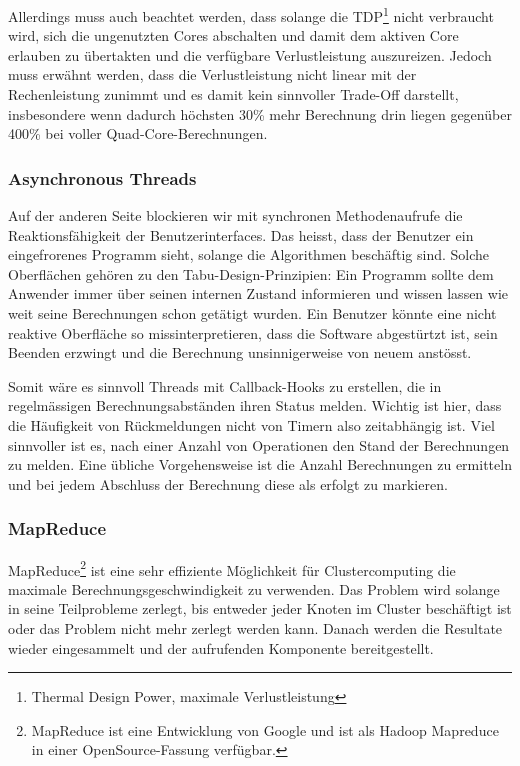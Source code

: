 Allerdings muss auch beachtet werden, dass solange die TDP\footnote{Thermal
Design Power, maximale Verlustleistung} nicht verbraucht wird, sich die
ungenutzten Cores abschalten und damit dem aktiven Core erlauben zu übertakten
und die verfügbare Verlustleistung auszureizen.  Jedoch muss erwähnt werden,
dass die Verlustleistung nicht linear mit der Rechenleistung zunimmt und es
damit kein sinnvoller Trade-Off darstellt, insbesondere wenn dadurch höchsten
30\% mehr Berechnung drin liegen gegenüber 400\% bei voller
Quad-Core-Berechnungen.

\subsubsection{Asynchronous Threads}
Auf der anderen Seite blockieren wir mit synchronen Methodenaufrufe die
Reaktionsfähigkeit der Benutzerinterfaces. Das heisst, dass der Benutzer ein
eingefrorenes Programm sieht, solange die Algorithmen beschäftig sind. Solche
Oberflächen gehören zu den Tabu-Design-Prinzipien: Ein Programm sollte dem
Anwender immer über seinen internen Zustand informieren und wissen lassen wie
weit seine Berechnungen schon getätigt wurden. Ein Benutzer könnte eine nicht
reaktive Oberfläche so missinterpretieren, dass die Software abgestürtzt ist,
sein Beenden erzwingt und die Berechnung unsinnigerweise von neuem anstösst.

Somit wäre es sinnvoll Threads mit Callback-Hooks zu erstellen, die in
regelmässigen Berechnungsabständen ihren Status melden. Wichtig ist hier, dass
die Häufigkeit von Rückmeldungen nicht von Timern also zeitabhängig ist. Viel
sinnvoller ist es, nach einer Anzahl von Operationen den Stand der
Berechnungen zu melden. Eine übliche Vorgehensweise ist die Anzahl
Berechnungen zu ermitteln und bei jedem Abschluss der Berechnung diese als
erfolgt zu markieren.

\subsubsection{MapReduce}
MapReduce\footnote{MapReduce ist eine Entwicklung von Google und ist als
Hadoop Mapreduce in einer OpenSource-Fassung verfügbar.} ist eine sehr
effiziente Möglichkeit für Clustercomputing die maximale
Berechnungsgeschwindigkeit zu verwenden. Das Problem wird solange in seine
Teilprobleme zerlegt, bis entweder jeder Knoten im Cluster beschäftigt ist
oder das Problem nicht mehr zerlegt werden kann. Danach werden die Resultate
wieder eingesammelt und der aufrufenden Komponente
bereitgestellt.\cite{Google:MapReduce}


